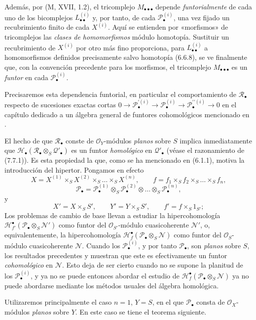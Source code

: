 \begin{remarks}[6.10.3]
Además, por (M, XVII, 1.2), el tricomplejo
$M_{\bullet\bullet\bullet}$ depende \emph{funtorialmente} de cada uno de
los bicomplejos $L_{\bullet\bullet}^{(i)}$ y, por tanto, de cada
$\mathscr P_\bullet^{(i)}$, una vez fijado un recubrimiento finito de
cada $X^{(i)}$. Aquí se entienden por «morfismos» de tricomplejos
las \emph{clases de homomorfismos} módulo homotopía. Sustituir un
recubrimiento de $X^{(i)}$ por otro más fino proporciona, para
$L_{\bullet\bullet}^{(i)}$ a homomorfismos definidos precisamente salvo homotopía (6.6.8), se ve finalmente que, con la convención precedente para los morfismos, el tricomplejo $M_{\bullet\bullet\bullet}$ es un \emph{funtor} en
cada $\mathscr P_\bullet^{(i)}$.

Precisaremos esta dependencia funtorial, en particular el
comportamiento de $\mathscr R_\bullet$ respecto de sucesiones exactas
cortas
$0\longrightarrow\mathscr P_\bullet^{\prime(i)}\longrightarrow\mathscr P_\bullet^{(i)}\longrightarrow\mathscr P_\bullet^{\prime\prime(i)}\longrightarrow0$
en el capítulo dedicado a un álgebra general de funtores
cohomológicos mencionado en .
\end{remarks}

\begin{scholium}[6.10.4]
\label{III.6.10.4}
El hecho de que $\mathscr R_\bullet$ conste de $\mathscr O_Y$-módulos
\emph{planos} sobre $S$ implica inmediatamente que
$\mathscr H_\bullet(\mathscr R_\bullet\otimes_S\mathscr Q'_\bullet)$
es un funtor \emph{homológico} en $\mathscr Q'_\bullet$ (véase el razonamiento de (7.7.1)). Es esta propiedad la que, como se ha mencionado en (6.1.1), motiva la introducción del hipertor. Pongamos en efecto \[
  X=X^{(1)}\times_SX^{(2)}\times_S\ldots\times_SX^{(n)},
  \qquad
  f=f_1\times_Sf_2\times_S\ldots\times_Sf_n,
\]
\[
  \mathscr P_\bullet
  =
  \mathscr P_\bullet^{(1)}
  \otimes_S\mathscr P_\bullet^{(2)}
  \otimes\ldots\otimes_S\mathscr P_\bullet^{(n)},
\]
y
\[
  X'=X\times_SS',
  \qquad
  Y'=Y\times_SS',
  \qquad
  f'=f\times_S1_{S'};
\]
Los problemas de cambio de base llevan a estudiar la
hipercohomología
$\mathscr H^\bullet_{f'}(\mathscr P_\bullet\otimes_S\mathscr N')$
como funtor del $\mathscr O_{S'}$-módulo cuasicoherente $\mathscr N'$, o,
equivalentemente, la hipercohomología
$\mathscr H^\bullet_f(\mathscr P_\bullet\otimes_S\mathscr N)$
como funtor del $\mathscr O_S$-módulo cuasicoherente $\mathscr N$. Cuando
los $\mathscr P_\bullet^{(i)}$, y por tanto $\mathscr P_\bullet$, son
\emph{planos} sobre $S$, los resultados precedentes y
 muestran que este es efectivamente un funtor
\emph{cohomológico} en $\mathscr N$. Esto deja de ser cierto cuando no se
supone la planitud de los $\mathscr P_\bullet^{(i)}$, y ya no se puede entonces abordar el estudio de $\mathscr H^\bullet_f(\mathscr P_\bullet\otimes_S\mathscr N)$
ya no puede abordarse mediante los métodos usuales del álgebra
homológica.

Utilizaremos principalmente el caso $n=1$, $Y=S$, en el que
$\mathscr P_\bullet$ consta de $\mathscr O_X$-módulos \emph{planos} sobre $Y$.
En este caso se tiene el teorema siguiente.
\end{scholium}


